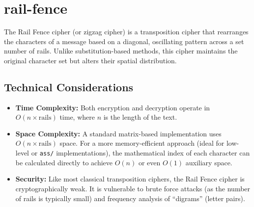 \section{rail-fence}
The Rail Fence cipher (or zigzag cipher) is a transposition cipher that rearranges the characters of a message based on a diagonal, oscillating pattern across a set number of rails. Unlike substitution-based methods, this cipher maintains the original character set but alters their spatial distribution.



\subsection*{Technical Considerations}
\begin{itemize}
    \item \textbf{Time Complexity:} Both encryption and decryption operate in $O(n \times \text{rails})$ time, where $n$ is the length of the text.
    \item \textbf{Space Complexity:} A standard matrix-based implementation uses $O(n \times \text{rails})$ space. For a more memory-efficient approach (ideal for low-level or \texttt{ass/} implementations), the mathematical index of each character can be calculated directly to achieve $O(n)$ or even $O(1)$ auxiliary space.
    \item \textbf{Security:} Like most classical transposition ciphers, the Rail Fence cipher is cryptographically weak. It is vulnerable to brute force attacks (as the number of rails is typically small) and frequency analysis of ``digrams'' (letter pairs).
\end{itemize}